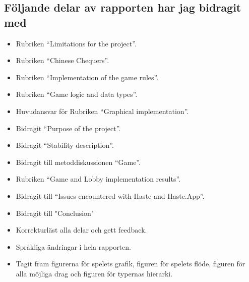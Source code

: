 \subsection{Följande delar av rapporten har jag bidragit med}
\begin{itemize}
    \item Rubriken “Limitations for the project”.
    \item Rubriken “Chinese Chequers”.
    \item Rubriken “Implementation of the game rules”.
    \item Rubriken “Game logic and data types”.
    \item Huvudansvar för Rubriken “Graphical implementation”.
    \item Bidragit “Purpose of the project”.
    \item Bidragit “Stability description”.
    \item Bidragit till metoddiskussionen “Game”.
    \item Rubriken “Game and Lobby implementation results”.
    \item Bidragit till “Issues encountered with Haste and Haste.App”.
    \item Bidragit till "Conclusion"
    \item Korrekturläst alla delar och gett feedback.
    \item Språkliga ändringar i hela rapporten.
    \item Tagit fram figurerna för spelets grafik, figuren för spelets flöde, figuren för alla möjliga drag och figuren för typernas hierarki.
\end{itemize}
